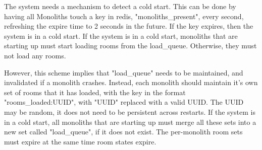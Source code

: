 The system needs a mechanism to detect a cold start. This can be done by having all Monoliths touch a key in redis, "monoliths\_present", every second, refreshing the expire time to 2 seconds in the future. If the key expires, then the system is in a cold start. If the system is in a cold start, monoliths that are starting up must start loading rooms from the load\_queue. Otherwise, they must not load any rooms.

However, this scheme implies that "load\_queue" needs to be maintained, and invalidated if a monolith crashes. Instead, each monolith should maintain it's own set of rooms that it has loaded, with the key in the format "rooms\_loaded:UUID", with "UUID" replaced with a valid UUID. The UUID may be random, it does not need to be persistent across restarts. If the system is in a cold start, all monoliths that are starting up must merge all these sets into a new set called "load\_queue", if it does not exist. The per-monolith room sets must expire at the same time room states expire.

